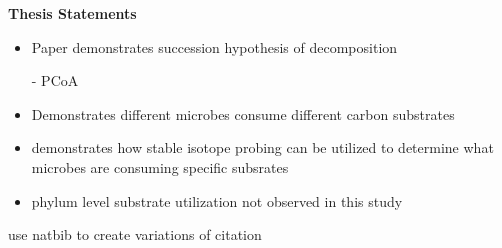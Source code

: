 \textbf{Thesis Statements}
\begin{itemize}
\item Paper demonstrates succession hypothesis of decomposition
     
     - PCoA
\item Demonstrates different microbes consume different carbon substrates
\item demonstrates how stable isotope probing can be utilized to determine what microbes are consuming specific subsrates
\item phylum level substrate utilization not observed in this study
\end{itemize}



use natbib to create variations of citation




